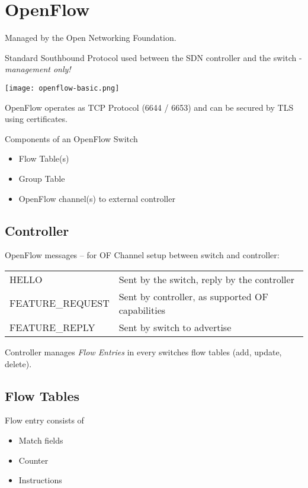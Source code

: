 \section{OpenFlow}
Managed by the Open Networking Foundation.

Standard Southbound Protocol used between the SDN controller and the switch - \emph{management only!}

\begin{centering}
\texttt{[image: openflow-basic.png]}
\end{centering}

OpenFlow operates as TCP Protocol (6644 / 6653) and can be secured by TLS using certificates.

\noindent
Components of an OpenFlow Switch
\begin{itemize}
	\item Flow Table(s)
	\item Group Table
	\item OpenFlow channel(s) to external controller
\end{itemize}

\subsection{Controller}
OpenFlow messages -- for OF Channel setup between switch and controller:

\begin{table}[h]
	\begin{tabular}{l|l}
	HELLO & Sent by the switch, reply by the controller \\
		FEATURE\_REQUEST & Sent by controller, as supported OF capabilities \\
		FEATURE\_REPLY & Sent by switch to advertise \\
	\end{tabular}
\end{table}

Controller manages \emph{Flow Entries} in every switches flow tables (add, update, delete).

\subsection{Flow Tables}
Flow entry consists of
\begin{itemize}
	\item Match fields
	\item Counter
	\item Instructions
\end{itemize}

